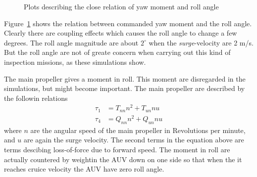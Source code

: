 	\begin{figure}[htbp]
		\centering
		\caption{Plots describing the close relation of yaw moment and roll angle}
		\label{fig:ch4_rollyawmoment}
	\end{figure}
	Figure~\ref{fig:ch4_rollyawmoment} shows the relation between commanded yaw moment and the roll angle.
	Clearly there are coupling effects which causes the roll angle to change a few degrees. The roll angle
	magnitude are about $2^\circ$ when the \textit{surge}-velocity are 2 m/s. But the roll angle are not
	of greate concern when carrying out this kind of inspection missions, as these simulations show.

	
	The main propeller gives a moment in roll. This moment are disregarded in the simulations, but might
	become important. The main propeller are described by the followin relations
	\begin{equation}
		\begin{aligned}
			\tau_1 &= T_{nn} n^2 + T_{un} n u \\
			\tau_4 &= Q_{nn} n^2 + Q_{un} n u
		\end{aligned}
	\end{equation}
	where $n$ are the angular speed of the main propeller in Revolutions per minute, and $u$ are again the
	surge velocity. The second terms in the equation above are terms descibing loss-of-force due to
	forward speed. The moment in roll are actually countered by weightin the AUV down on one side so that when
	the it reaches cruice velocity the AUV have zero roll angle. \cite{Bjorn_gjelstad_talk}

